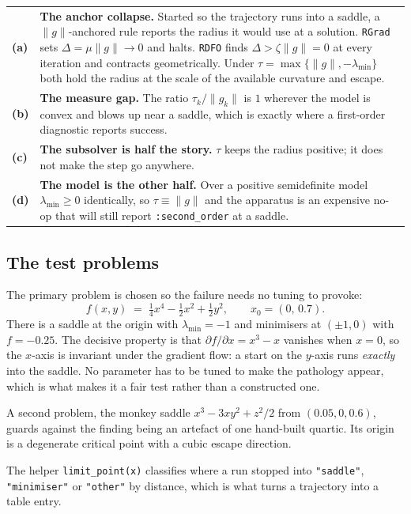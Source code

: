 \documentclass[11pt,a4paper]{article}
\newcommand{\jl}[1]{\texttt{\small #1}}
\newcommand{\gnorm}{\lVert g\rVert}
\newcommand{\gk}{\lVert g_k\rVert}
\begin{document}
\begin{longtable}{@{}p{12mm}p{134mm}@{}}
\toprule
\endhead
\textbf{(a)} &
\textbf{The anchor collapse.} Started so the trajectory runs into a saddle, a
$\gnorm$-anchored rule reports the radius it would use at a solution. \jl{RGrad}
sets $\Delta = \mu\gnorm \to 0$ and halts. \jl{RDFO} finds $\Delta > \zeta\gnorm = 0$
at every iteration and contracts geometrically. Under
$\tau = \max\{\gnorm, -\lambda_{\min}\}$ both hold the radius at the scale of the
available curvature and escape. \\[3pt]
\textbf{(b)} &
\textbf{The measure gap.} The ratio $\tau_k/\gk$ is $1$ wherever the model is
convex and blows up near a saddle, which is exactly where a first-order diagnostic
reports success. \\[3pt]
\textbf{(c)} &
\textbf{The subsolver is half the story.} $\tau$ keeps the radius positive; it does
not make the step go anywhere. \\[3pt]
\textbf{(d)} &
\textbf{The model is the other half.} Over a positive semidefinite model
$\lambda_{\min}\ge 0$ identically, so $\tau \equiv \gnorm$ and the apparatus is an
expensive no-op that will still report \jl{:second\_order} at a saddle. \\
\bottomrule
\end{longtable}

\subsection{The test problems}

The primary problem is chosen so the failure needs no tuning to provoke:
\[
  f(x,y) \;=\; \tfrac{1}{4}x^4 - \tfrac{1}{2}x^2 + \tfrac{1}{2}y^2 ,
  \qquad x_0 = (0,\,0.7).
\]
There is a saddle at the origin with $\lambda_{\min} = -1$ and minimisers at
$(\pm 1, 0)$ with $f = -0.25$. The decisive property is that
$\partial f/\partial x = x^3 - x$ vanishes when $x = 0$, so the $x$-axis is
invariant under the gradient flow: a start on the $y$-axis runs \emph{exactly} into
the saddle. No parameter has to be tuned to make the pathology appear, which is
what makes it a fair test rather than a constructed one.

A second problem, the monkey saddle $x^3 - 3xy^2 + z^2/2$ from $(0.05, 0, 0.6)$,
guards against the finding being an artefact of one hand-built quartic. Its origin
is a degenerate critical point with a cubic escape direction.

The helper \jl{limit\_point(x)} classifies where a run stopped into
\jl{"saddle"}, \jl{"minimiser"} or \jl{"other"} by distance, which is what turns a
trajectory into a table entry.
\end{document}
